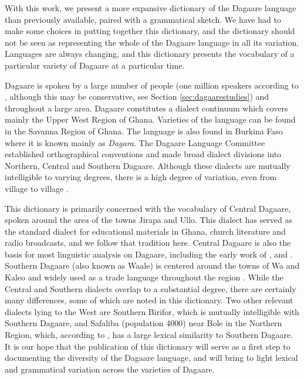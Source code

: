 \begin{refsection}
\largerpage
With this work, we present a more expansive dictionary of the Dagaare language than previously available, paired with a grammatical sketch. We have had to make some choices in putting together this dictionary, and the dictionary should not be seen as representing the whole of the Dagaare language in all its variation.   Languages are always changing, and this dictionary presents the vocabulary of a particular variety of Dagaare at a particular time.  

Dagaare is spoken by a large number of people (one million speakers according to \citealt{Ethnologue}, although this may be conservative, see Section \ref{sec:dagaarestudies}) and throughout a large area.  Dagaare constitutes a dialect continuum which covers mainly the Upper West Region of Ghana. Varieties of the language can be found in the Savanna Region of Ghana. The language is also found in Burkina Faso where it is known mainly as  \textit{Dagara}.
The Dagaare Language Committee \citep{DagaareLanguageCommission1982} established  orthographical conventions and made broad dialect divisions into Northern, Central and Southern Dagaare.  Although these dialects are mutually intelligible to varying degrees, there is a high degree of variation, even from village to village \citep[2-5]{Bodomo1997}.   

This dictionary is primarily concerned with the vocabulary of Central Dagaare, spoken around the area of the towns Jirapa and Ullo.  This dialect has served as the standard dialect for educational materials in Ghana, church literature and radio broadcasts, and we follow that tradition here.   Central Dagaare is also the basis for most linguistic analysis on Dagaare, including the early work of \citet{Wilson1962}, \citet{Kennedy1966} and \citet{Hall1977}.  Southern Dagaare (also known as Waale) is centered around the towns of Wa and Kaleo and widely used as a trade language throughout the region \citep{Bodomo1997}. While the Central and Southern dialects overlap to a substantial degree, there are certainly many differences, some of which are noted in this dictionary.  Two other relevant dialects lying to the West are Southern Birifor, which is mutually intelligible with Southern Dagaare, and Safaliba (population 4000) near Bole in the Northern Region, which, according to \citet{Ethnologue}, has a large lexical similarity to Southern Dagaare.  It is our hope that the publication of this dictionary will serve as a first step to documenting the diversity of the Dagaare language, and will bring to light lexical and grammatical variation across the varieties of Dagaare.    


\end{refsection}
